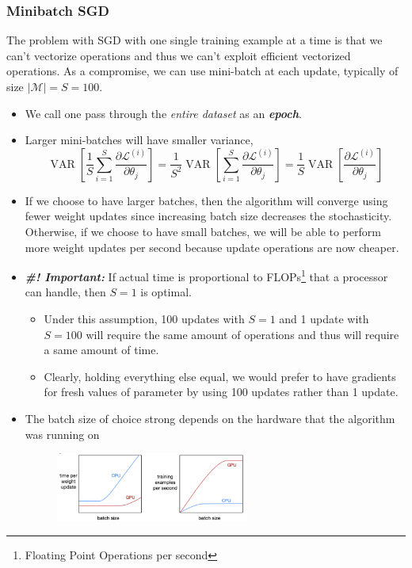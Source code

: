 \documentclass[11pt]{article}
\begin{document}
\subsubsection{Minibatch SGD}
The problem with SGD with one single training example at a time is that we can't vectorize operations and thus we can't exploit efficient vectorized operations. As a compromise, we can use mini-batch at each update, typically of size $|\mathcal{M}| = S = 100$. 
\begin{itemize}
    \item We call one pass through the \textit{entire dataset} as an \textbf{\textit{epoch}}. 
    \item Larger mini-batches will have smaller variance, 
        \begin{equation}
            \operatorname{VAR}\left[\frac{1}{S} \sum_{i=1}^{S} \frac{\partial \mathcal{L}^{(i)}}{\partial \theta_{j}}\right]=\frac{1}{S^{2}} \operatorname{VAR}\left[\sum_{i=1}^{S} \frac{\partial \mathcal{L}^{(i)}}{\partial \theta_{j}}\right]=\frac{1}{S} \operatorname{VAR}\left[\frac{\partial \mathcal{L}^{(i)}}{\partial \theta_{j}}\right]
        \end{equation}
    \item If we choose to have larger batches,  then the algorithm will converge using fewer weight updates since increasing batch size decreases the stochasticity. Otherwise, if we choose to have small batches, we will be able to perform more weight updates per second because update operations are now cheaper. 
    \item \textit{\textbf{\#! Important:}} If actual time is proportional to FLOPs\footnote{Floating Point Operations per second} that a processor can handle, then $S =1$ is optimal.
    \begin{itemize}
        \item Under this assumption, 100 updates with $S = 1$ and 1 update with $S = 100$ will require the same amount of operations and thus will require a same amount of time. 
        \item Clearly, holding everything else equal, we would prefer to have gradients for fresh values of parameter by using 100 updates rather than 1 update. 
    \end{itemize}
    \item The batch size of choice strong depends on the hardware that the algorithm was running on\cite{week4}
    \begin{figure}[H]
        \center\includegraphics[width=0.6\textwidth]{img/parallel_flops}
    \end{figure}
\end{itemize}
\end{document}
